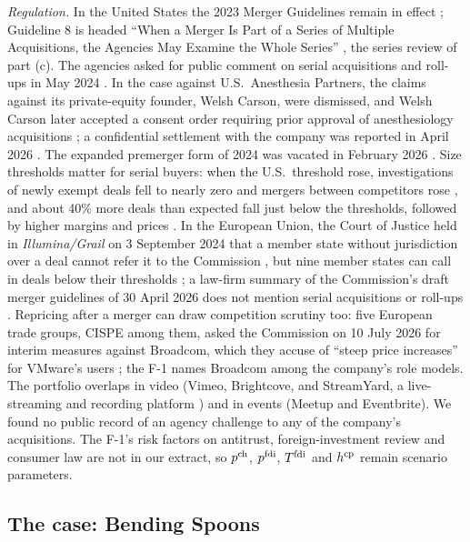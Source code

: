 \noindent\emph{Regulation.} In the United States the 2023 Merger Guidelines remain in effect \citep{ferguson2025memo}; Guideline 8 is headed ``When a Merger Is Part of a Series of Multiple Acquisitions, the Agencies May Examine the Whole Series'' \citep{doj2023guidelines}, the series review of part (c). The agencies asked for public comment on serial acquisitions and roll-ups in May 2024 \citep{thompsonhine2024rfi}. In the case against U.S.\ Anesthesia Partners, the claims against its private-equity founder, Welsh Carson, were dismissed, and Welsh Carson later accepted a consent order requiring prior approval of anesthesiology acquisitions \citep{stblaw2025welshcarson}; a confidential settlement with the company was reported in April 2026 \citep{insurancejournal2026usap}. The expanded premerger form of 2024 was vacated in February 2026 \citep{bakerbotts2026hsr}. Size thresholds matter for serial buyers: when the U.S.\ threshold rose, investigations of newly exempt deals fell to nearly zero and mergers between competitors rose \citep{wollmann2019stealth}, and about 40\% more deals than expected fall just below the thresholds, followed by higher margins and prices \citep{kepler2023stealth}. In the European Union, the Court of Justice held in \emph{Illumina/Grail} on 3 September 2024 that a member state without jurisdiction over a deal cannot refer it to the Commission \citep{gtlaw2024illumina}, but nine member states can call in deals below their thresholds \citep{whitecase2025callin}; a law-firm summary of the Commission's draft merger guidelines of 30 April 2026 does not mention serial acquisitions or roll-ups \citep{macfarlanes2026draft}. Repricing after a merger can draw competition scrutiny too: five European trade groups, CISPE among them, asked the Commission on 10 July 2026 for interim measures against Broadcom, which they accuse of ``steep price increases'' for VMware's users \citep{reuters2026broadcom}; the F-1 names Broadcom among the company's role models. The portfolio overlaps in video (Vimeo, Brightcove, and StreamYard, a live-streaming and recording platform \citep{silicon2024streamyard}) and in events (Meetup \citep{businesswire2024meetup} and Eventbrite). We found no public record of an agency challenge to any of the company's acquisitions. The F-1's risk factors on antitrust, foreign-investment review and consumer law are not in our extract, so $p^{\rm ch}$, $p^{\rm fdi}$, $T^{\rm fdi}$ and $h^{\rm cp}$ remain scenario parameters.

\subsection{The case: Bending Spoons}\label{sec:acq-case}

